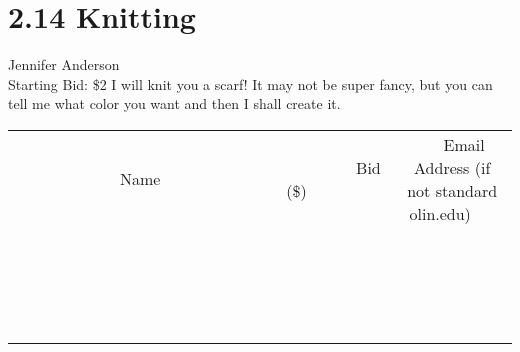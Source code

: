 \documentclass[11pt]{article}
\begin{document}
\section*{2.14 Knitting}
Jennifer Anderson
\\
Starting Bid: \$2
\newline
I will knit you a scarf! It may not be super fancy, but you can tell me what color you want and then I shall create it.
\\[3ex]
\begin{tabular}{c c c}
~~~~~~~~~~~~~Name~~~~~~~~~~~~~ & ~~~~~~~~~Bid (\$)~~~~~~~~~  & ~~~Email Address (if not standard olin.edu)~~~\\
 & & \\
\hline
 & & \\
\hline
 & & \\
\hline
 & & \\
\hline
 & & \\
\hline
 & & \\
\hline
 & & \\
\hline
 & & \\
\hline
 & & \\
\hline
 & & \\
\hline
 & & \\
\hline
 & & \\
\hline
 & & \\
\hline
 & & \\
\hline
 & & \\
\hline
 & & \\
\hline
 & & \\
\hline
 & & \\
\hline
 & & \\
\hline
\end{tabular}
\newpage
\end{document}
